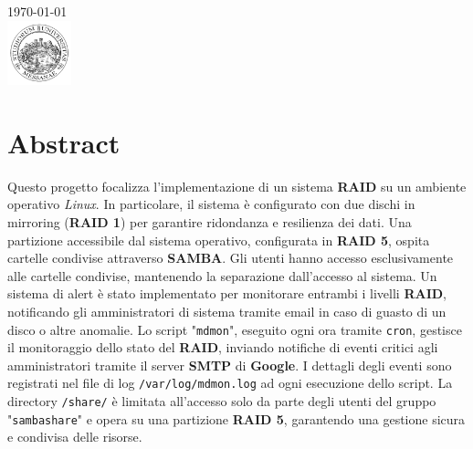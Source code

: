 \documentclass[11pt]{article}
\begin{document}
\begin{titlepage}


    {\large \today}\\[2cm] %


    \includegraphics[width=70px, keepaspectratio]{"unime.png"}\\[1cm] %


    \vfill %

\end{titlepage}

\tableofcontents
\pagebreak

\section{Abstract}
Questo progetto focalizza l'implementazione di un sistema \textbf{RAID} su un ambiente operativo \textit{Linux}. In particolare, il sistema è configurato con due dischi in mirroring (\textbf{RAID 1}) per garantire ridondanza e resilienza dei dati. Una partizione accessibile dal sistema operativo, configurata in \textbf{RAID 5}, ospita cartelle condivise attraverso \textbf{SAMBA}. Gli utenti hanno accesso esclusivamente alle cartelle condivise, mantenendo la separazione dall'accesso al sistema. Un sistema di alert è stato implementato per monitorare entrambi i livelli \textbf{RAID}, notificando gli amministratori di sistema tramite email in caso di guasto di un disco o altre anomalie. Lo script "\texttt{mdmon}", eseguito ogni ora tramite \texttt{cron}, gestisce il monitoraggio dello stato del \textbf{RAID}, inviando notifiche di eventi critici agli amministratori tramite il server \textbf{SMTP} di \textbf{Google}. I dettagli degli eventi sono registrati nel file di log \texttt{/var/log/mdmon.log} ad ogni esecuzione dello script. La directory \texttt{/share/} è limitata all'accesso solo da parte degli utenti del gruppo "\texttt{sambashare}" e opera su una partizione \textbf{RAID 5}, garantendo una gestione sicura e condivisa delle risorse.
\end{document}

